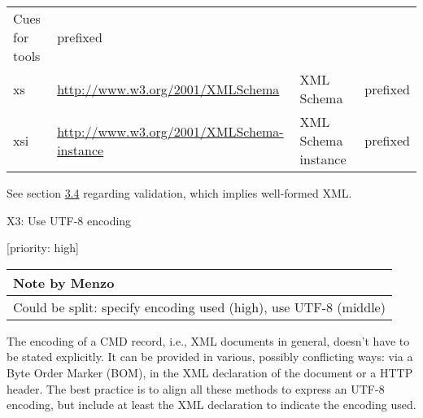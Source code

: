 \begin{longtable}[c]{@{}llll@{}}
\begin{minipage}[t]{0.05\columnwidth}\raggedright\strut
Cues for tools
\strut\end{minipage} &
\begin{minipage}[t]{0.05\columnwidth}\raggedright\strut
prefixed
\strut\end{minipage}\tabularnewline
\begin{minipage}[t]{0.05\columnwidth}\raggedright\strut
xs
\strut\end{minipage} &
\begin{minipage}[t]{0.05\columnwidth}\raggedright\strut
\url{http://www.w3.org/2001/XMLSchema}
\strut\end{minipage} &
\begin{minipage}[t]{0.05\columnwidth}\raggedright\strut
XML Schema
\strut\end{minipage} &
\begin{minipage}[t]{0.05\columnwidth}\raggedright\strut
prefixed
\strut\end{minipage}\tabularnewline
\begin{minipage}[t]{0.05\columnwidth}\raggedright\strut
xsi
\strut\end{minipage} &
\begin{minipage}[t]{0.05\columnwidth}\raggedright\strut
\url{http://www.w3.org/2001/XMLSchema-instance}
\strut\end{minipage} &
\begin{minipage}[t]{0.05\columnwidth}\raggedright\strut
XML Schema instance
\strut\end{minipage} &
\begin{minipage}[t]{0.05\columnwidth}\raggedright\strut
prefixed
\strut\end{minipage}\tabularnewline
\bottomrule
\end{longtable}

See section \href{./Workflow.md}{3.4} regarding validation, which
implies well-formed XML.

X3: Use UTF-8 encoding

{[}priority: high{]}

\begin{longtable}[c]{@{}l@{}}
\toprule
Note by Menzo\tabularnewline
\midrule
\endhead
Could be split: specify encoding used (high), use UTF-8
(middle)\tabularnewline
\bottomrule
\end{longtable}

The encoding of a CMD record, i.e., XML documents in general, doesn't
have to be stated explicitly. It can be provided in various, possibly
conflicting ways: via a Byte Order Marker (BOM), in the XML declaration
of the document or a HTTP header. The best practice is to align all
these methods to express an UTF-8 encoding, but include at least the XML
declaration to indicate the encoding used.
